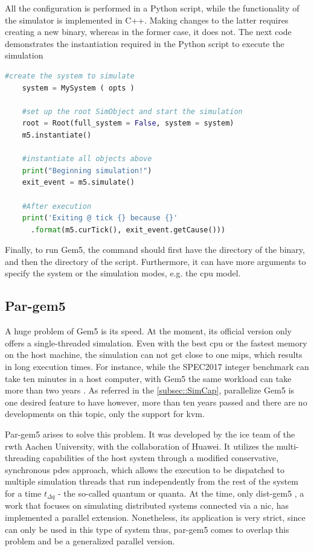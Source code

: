 All the configuration is performed in a Python script, while the functionality of the simulator is implemented in C++. Making changes to the 
latter requires creating a new binary, whereas in the former case, it does not. The next code demonstrates the instantiation 
required in the Python script to execute the simulation

\pagebreak

\begin{lstlisting}[language=Python, caption=Script to instantiate and execute the simulation]
    #create the system to simulate
    system = MySystem ( opts )

    #set up the root SimObject and start the simulation
    root = Root(full_system = False, system = system)
    m5.instantiate()

    #instantiate all objects above
    print("Beginning simulation!")
    exit_event = m5.simulate()

    #After execution
    print('Exiting @ tick {} because {}'
      .format(m5.curTick(), exit_event.getCause()))

\end{lstlisting}

Finally, to run Gem5, the command should first have the directory of the binary, and then the directory of the script. Furthermore, it can 
have more arguments to specify the system or the simulation modes, e.g. the \gls{cpu} model.

\subsection{Par-gem5}
\label{subsec:pargem5}

A huge problem of Gem5 is its speed. At the moment, its official version only offers a single-threaded simulation. Even with the best 
\gls{cpu} or the fastest memory on the host machine, the simulation can not get close to one \gls{mips}, which results in long execution 
times. For instance, while the SPEC2017 integer benchmark can take ten minutes in a host computer, with Gem5 the same workload can take more 
than two years \cite{pargem5}. As referred in the \autoref{subsec::SimCap}, parallelize Gem5 is one desired feature to have however, more than 
ten years passed and there are no developments on this topic, only the support for \gls{kvm}. 

Par-gem5 \cite{pargem5} arises to solve this problem. It was developed by the \gls{ice} team of the \gls{rwth} Aachen University, with the 
collaboration of Huawei. It utilizes the multi-threading capabilities of the host system through a modified conservative, synchronous 
\gls{pdes} approach, which allows the execution to be dispatched to multiple simulation threads that run independently from the rest of 
the system for a time $t_{\Delta q}$ - the so-called quantum or quanta. At the time, only dist-gem5 \cite{dist-gem5}, a work that focuses 
on simulating distributed systems connected via a \gls{nic}, has implemented a parallel extension. Nonetheless, its application is very strict, 
since can only be used in this type of system thus, par-gem5 comes to overlap this problem and be a generalized parallel version.

